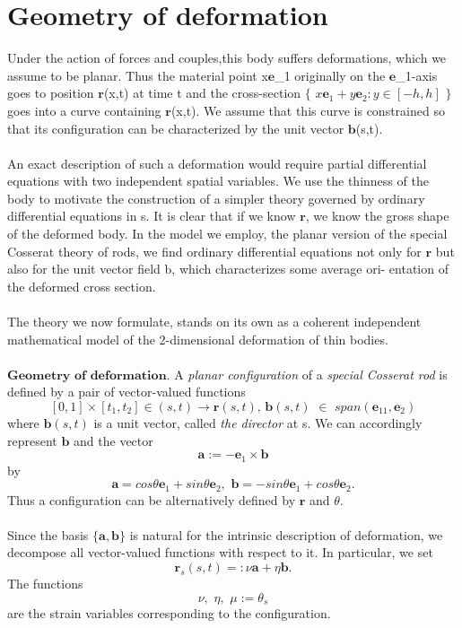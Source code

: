 \documentclass[12pt]{article}
\begin{document}
\section{Geometry of deformation}
Under the action of forces and couples,this body suffers deformations, which we assume to be planar. Thus the material point x$\mathbf{e}$_1 originally on the $\mathbf{e}$_1-axis goes to position $\mathbf{r}$(x,t) at time t and the cross-section  $\{$
$x\mathbf{e}_1 + y\mathbf{e}_2:y \in[-h,h]$ 
$\}$ goes into a curve containing $\mathbf{r}$(x,t). We assume that this curve is constrained so that its configuration can be characterized by the unit vector $\mathbf{b}$(s,t).
\\\\
An exact description of such a deformation would require partial differential equations with two independent spatial variables. We use the thinness of the body to motivate the construction of a simpler theory governed by ordinary differential equations in s. It is clear that if we know $\mathbf{r}$, we know the gross shape of the deformed body. In the model we employ, the planar version of the special Cosserat theory of rods, we find ordinary differential equations not only for $\mathbf{r}$ but also for the unit vector field b, which characterizes some average ori- entation of the deformed cross section. 
\\\\
The theory we now formulate, stands on its own as a coherent independent mathematical model of the 2-dimensional deformation of thin bodies.
\\\\
$\mathbf{Geometry}\,\,\mathbf{of}\,\,\mathbf{deformation}.$ A \emph{planar configuration} of a \emph{special Cosserat rod} is defined by a pair of vector-valued functions
\[[0,1] × [t_1,t_2] \in (s,t) → \mathbf{r}(s,t),\,\mathbf{b}(s,t)\,\,\in\,\,span(\mathbf{e}_11,\mathbf{e}_2)\]
where $\mathbf{b}(s,t)$ is a unit vector, called \emph{the director} at s. We can accordingly
represent $\mathbf{b}$ and the vector 
\[ \mathbf{a} := −\mathbf{e}_1 \times \mathbf{b}\]
by 
\[ \mathbf{a}=cos\theta\mathbf{e}_1+sin\theta\mathbf{e}_2,\,\,\mathbf{b}=−sin\theta\mathbf{e}_1+cos\theta\mathbf{e}_2.\]
Thus a configuration can be alternatively defined by $\mathbf{r}$ and $\theta$.
\\\\
Since the basis $\{\mathbf{a},\mathbf{b}\}$ is natural for the intrinsic description of deformation, we decompose all vector-valued functions with respect to it. In
particular, we set
\[ \mathbf{r}_s(s,t) =: \nu\mathbf{a} + \eta\mathbf{b}. \]
The functions
\[ \nu,\,\,\eta,\,\,\mu:= \theta_s \]
are the strain variables corresponding to the configuration. 
\end{document}
